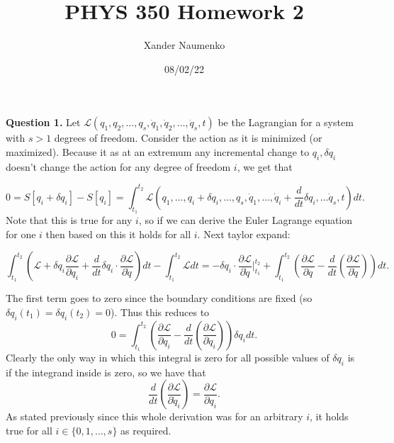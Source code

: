\documentclass[letterpaper, reqno,11pt]{article}
\begin{document}
\title{PHYS 350 Homework 2}
\date{08/02/22}
\author{Xander Naumenko}
\maketitle

{\noindent\bf Question 1.} Let $\mathcal L(q_1, q_2, \ldots, q_s, \dot q_1, \dot q_2, \ldots, \dot q_s, t)$ be the Lagrangian for a system with $s>1$ degrees of freedom. Consider the action as it is minimized (or maximized). Because it as at an extremum any incremental change to $q_i, \delta q_i$ doesn't change the action for any degree of freedom $i$, we get that

\[
0=S[q_i+\delta q_i]-S[q_i]=\int_{t_1}^{t_2}\mathcal{L}(q_1,\ldots,q_i+\delta q_i,\ldots,q_s, \dot q_1, \ldots, \dot q_i+\frac{d}{dt}\delta q_i,\ldots \dot q_s, t) dt
.\]
Note that this is true for any $i$, so if we can derive the Euler Lagrange equation for one $i$ then based on this it holds for all $i$. Next taylor expand: 

\[
\int_{t_1}^{t_2} \left( \mathcal L+\delta q_i \frac{\partial \mathcal{L}}{\partial q_i} +\frac{d}{dt}\delta q_i\cdot \frac{\partial \mathcal L}{\partial \dot q} \right)dt -\int_{t_1}^{t_2}\mathcal L dt=-\delta q_i\cdot \frac{\partial \mathcal L}{\partial \dot q} \bigg|_{t_1}^{t_2}+\int_{t_1}^{t_2}\left( \frac{\partial \mathcal L}{\partial q} -\frac{d}{dt}\left( \frac{\partial \mathcal L}{\partial \dot q}  \right)  \right) dt
.\]

The first term goes to zero since the boundary conditions are fixed (so $\delta q_i(t_1)=\delta q_i(t_2)=0$). Thus this reduces to
\[
0=\int_{t_1}^{t_2}\left( \frac{\partial \mathcal L}{\partial q_i}-\frac{d}{dt}\left( \frac{\partial\mathcal L}{\partial \dot q_i} \right)  \right) \delta q_i dt
.\]
Clearly the only way in which this integral is zero for all possible values of $\delta q_i$ is if the integrand inside is zero, so we have that 
\[
 \frac{d}{dt}\left( \frac{\partial \mathcal L}{\partial \dot q_i} \right) =\frac{\partial \mathcal L}{\partial q_i}
.\]
As stated previously since this whole derivation was for an arbitrary $i$, it holds true for all $i\in \{0, 1, \ldots, s\} $ as required. 
\end{document}
